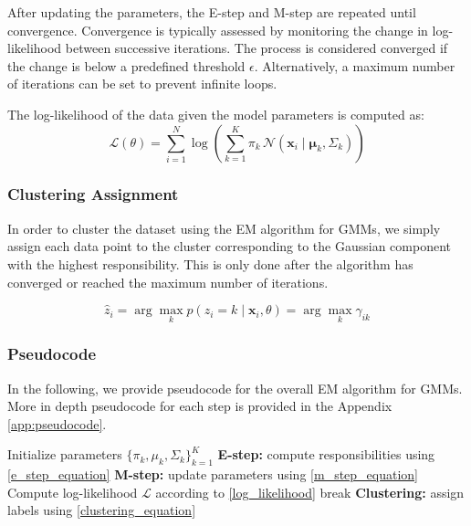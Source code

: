 After updating the parameters, the E-step and M-step are repeated until convergence. Convergence is typically assessed by monitoring
the change in log-likelihood between successive iterations. The process is considered converged if the change is below a predefined threshold $\epsilon$.
Alternatively, a maximum number of iterations can be set to prevent infinite loops.

The log-likelihood of the data given the model parameters is computed as:
\begin{equation}
\mathcal{L}(\theta ) = \sum_{i=1}^{N} \log \left( \sum_{k=1}^{K} \pi_k \, \mathcal{N}(\boldsymbol{x}_i \mid \boldsymbol{\mu}_k, \Sigma_k) \right)
\label{log_likelihood}
\end{equation}

\subsubsection*{Clustering Assignment}

In order to cluster the dataset \cite{kak2024clustering} using the EM algorithm for GMMs, we simply assign each data point to the cluster corresponding 
to the Gaussian component with the highest responsibility. This is only done after the algorithm has converged or reached the maximum number of iterations.

\begin{equation}
\hat{z}_i = \arg \max_{k} p(z_i = k \mid \boldsymbol{x}_i, \theta) = \arg\max_{k} \gamma_{ik}
\label{clustering_equation}
\end{equation}

\subsubsection*{Pseudocode}

In the following, we provide pseudocode for the overall EM algorithm for GMMs. More in depth pseudocode for each step is provided in the Appendix \ref{app:pseudocode}.
\begin{algorithm}[H]
\caption{Expectation-Maximization for GMM clustering}
\begin{algorithmic}[1]
\State Initialize parameters $\{\pi_k, \mu_k, \Sigma_k\}_{k=1}^K$
    \State \textbf{E-step:} compute responsibilities using \eqref{e_step_equation}
    \State \textbf{M-step:} update parameters using \eqref{m_step_equation}
    \State Compute log-likelihood $\mathcal{L}$ according to \eqref{log_likelihood}
        \State break 
    \EndIf
\EndFor
\State \textbf{Clustering:} assign labels using \eqref{clustering_equation}
\end{algorithmic}
\label{em_alg}
\end{algorithm}

